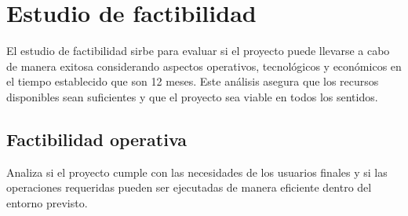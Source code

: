 \section{Estudio de factibilidad}
El estudio de factibilidad sirbe para evaluar si el proyecto puede llevarse a cabo de manera exitosa considerando aspectos operativos, tecnológicos y económicos en el tiempo establecido que son 12 meses. Este análisis asegura que los recursos disponibles sean suficientes y que el proyecto sea viable en todos los sentidos.

\subsection{Factibilidad operativa}

Analiza si el proyecto cumple con las necesidades de los usuarios finales y si las operaciones requeridas pueden ser ejecutadas de manera eficiente dentro del entorno previsto.

\begingroup
\setlength{\tabcolsep}{3pt} %
\renewcommand{\arraystretch}{1.2} %

